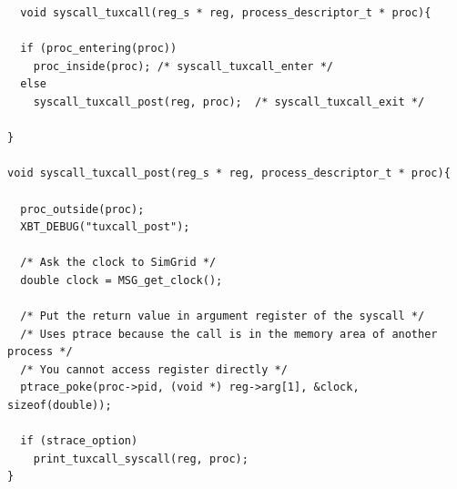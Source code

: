 \begin{lstlisting}
  void syscall_tuxcall(reg_s * reg, process_descriptor_t * proc){

  if (proc_entering(proc))
    proc_inside(proc); /* syscall_tuxcall_enter */
  else
    syscall_tuxcall_post(reg, proc);  /* syscall_tuxcall_exit */
  
}

void syscall_tuxcall_post(reg_s * reg, process_descriptor_t * proc){

  proc_outside(proc);
  XBT_DEBUG("tuxcall_post");

  /* Ask the clock to SimGrid */
  double clock = MSG_get_clock();
  
  /* Put the return value in argument register of the syscall */
  /* Uses ptrace because the call is in the memory area of another process */
  /* You cannot access register directly */
  ptrace_poke(proc->pid, (void *) reg->arg[1], &clock, sizeof(double)); 

  if (strace_option)
    print_tuxcall_syscall(reg, proc);
}
\end{lstlisting}

